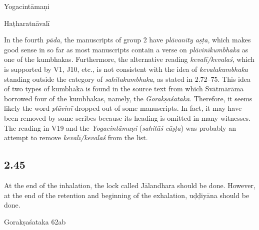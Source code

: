 \begin{ekdosis}
\begin{testimonia}[hp02_044]
Yogacintāmaṇi

\begin{versinnote}
\end{versinnote}

Haṭharatnāvalī

\begin{versinnote}
\end{versinnote}
\end{testimonia}

\begin{philcomm}[hp02_044]
In the fourth \emph{pāda}, the manuscripts of group 2 have \emph{plāvanīty aṣṭa}, which makes good sense in so far as most manuscripts contain a verse on \emph{plāvinīkumbhaka} as one of the kumbhakas. Furthermore, the alternative reading \emph{kevalī/kevalaś}, which is supported by V1, J10, etc., is not consistent with the idea of \emph{kevalakumbhaka} standing outside the category of \emph{sahitakumbhaka}, as stated in 2.72–75. This idea of two types of kumbhaka is found in the source text from which Svātmārāma borrowed four of the kumbhakas, namely, the \emph{Gorakṣaśataka}. Therefore, it seems likely the word \emph{plāvinī} dropped out of some manuscripts. In fact, it may have been removed by some scribes because its heading is omitted in many witnesses. The reading in V19 and the \emph{Yogacintāmaṇi} (\emph{sahitāś cāṣṭa}) was probably an attempt to remove \emph{kevalī/kevalaś} from the list.
\end{philcomm}

\subsection*{2.45}
\begin{translation}[hp02_045]
At the end of the inhalation, the lock called Jālandhara should be done. However, at the end of the retention and beginning of the exhalation, uḍḍiyāna should be done.
\end{translation}

\begin{sources}[hp02_045]
Gorakṣaśataka 62ab


\end{sources}
\end{ekdosis}
